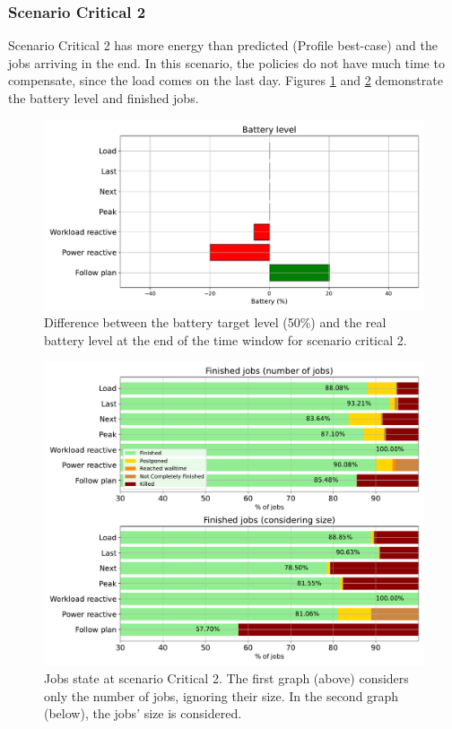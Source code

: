 \subsubsection{Scenario Critical 2}

Scenario Critical 2 has more energy than predicted (Profile best-case) and the jobs arriving in the end. In this scenario, the policies do not have much time to compensate, since the load comes on the last day. Figures \ref{fig:SoC_critical_2} and \ref{fig:jobs_critical_2} demonstrate the battery level and finished jobs. 

\begin{figure}[!htb]
    \centering
    \includegraphics[scale=0.55]{Images/Compensations/battery_critical_2.pdf}
    \caption{Difference between the battery target level (50\%) and the real battery level at the end of the time window for scenario critical 2.}
    \label{fig:SoC_critical_2}
\end{figure}

\begin{figure}[!htb]
    \centering
    \includegraphics[scale=0.55]{Images/Compensations/jobs_critical_2.pdf}
    \caption{Jobs state at scenario Critical 2. The first graph (above) considers only the number of jobs, ignoring their size. In the second graph (below), the jobs' size is considered.}
    \label{fig:jobs_critical_2}
\end{figure}

